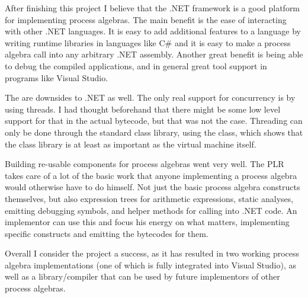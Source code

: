 	After finishing this project I believe that the .NET framework is a
	good platform for implementing process algebras. The main benefit is the 
	ease of interacting with other .NET languages. It is easy to add additional 
	features to a language by writing runtime libraries in languages like C\# 
	and it is easy to make a process algebra call into any arbitrary .NET 
	assembly. Another great benefit is being able to debug the compiled 
	applications, and in general great tool support in programs like Visual 
	Studio. 
	
	The are downsides to .NET as well. The only real support for concurrency is 
	by using threads. I had thought beforehand that there might be some low 
	level support for that in the actual bytecode, but that was not the case. 
	Threading can only be done through the standard class library, using the 
	 class, which shows that the class library is at least as 
	important as the virtual machine itself. 

	Building re-usable components for process algebras went very well. The PLR 
	takes care of a lot of the basic work that anyone implementing a process 
	algebra would otherwise have to do himself. Not just the basic process 
	algebra constructs themselves, but also expression trees for arithmetic 
	expressions, static analyses, emitting debugging symbols, and helper methods 
	for calling into .NET code. An implementor can use this and focus his energy 
	on what matters, implementing specific constructs and emitting the bytecodes 
	for them.
	
	Overall I consider the project a success, as it has resulted in two working 
	process algebra implementations (one of which is fully integrated into 
	Visual Studio), as well as a library/compiler that can be used by future 
	implementors of other process algebras.